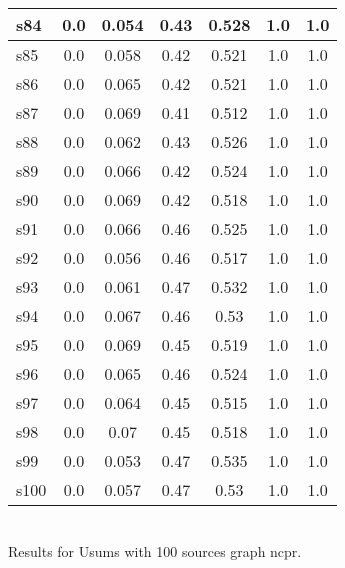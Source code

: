 \documentclass{article}
\begin{document}
\begin{tabular}{|l|c|c|c|c|c|c|}
s84 &0.0 & 0.054 & 0.43 & 0.528 & 1.0 & 1.0\\
\hline
s85 &0.0 & 0.058 & 0.42 & 0.521 & 1.0 & 1.0\\
\hline
s86 &0.0 & 0.065 & 0.42 & 0.521 & 1.0 & 1.0\\
\hline
s87 &0.0 & 0.069 & 0.41 & 0.512 & 1.0 & 1.0\\
\hline
s88 &0.0 & 0.062 & 0.43 & 0.526 & 1.0 & 1.0\\
\hline
s89 &0.0 & 0.066 & 0.42 & 0.524 & 1.0 & 1.0\\
\hline
s90 &0.0 & 0.069 & 0.42 & 0.518 & 1.0 & 1.0\\
\hline
s91 &0.0 & 0.066 & 0.46 & 0.525 & 1.0 & 1.0\\
\hline
s92 &0.0 & 0.056 & 0.46 & 0.517 & 1.0 & 1.0\\
\hline
s93 &0.0 & 0.061 & 0.47 & 0.532 & 1.0 & 1.0\\
\hline
s94 &0.0 & 0.067 & 0.46 & 0.53 & 1.0 & 1.0\\
\hline
s95 &0.0 & 0.069 & 0.45 & 0.519 & 1.0 & 1.0\\
\hline
s96 &0.0 & 0.065 & 0.46 & 0.524 & 1.0 & 1.0\\
\hline
s97 &0.0 & 0.064 & 0.45 & 0.515 & 1.0 & 1.0\\
\hline
s98 &0.0 & 0.07 & 0.45 & 0.518 & 1.0 & 1.0\\
\hline
s99 &0.0 & 0.053 & 0.47 & 0.535 & 1.0 & 1.0\\
\hline
s100 &0.0 & 0.057 & 0.47 & 0.53 & 1.0 & 1.0\\
\hline
\end{tabular}\\

\noindent Results for Usums with 100 sources graph ncpr.
\end{document}

